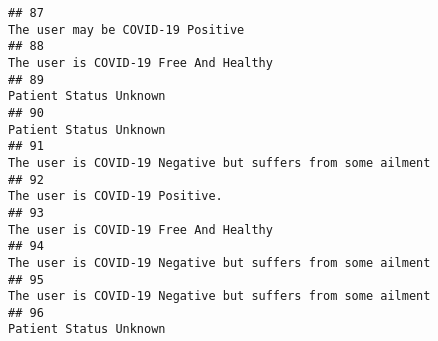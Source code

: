 \documentclass[
]{article}
\begin{document}
\begin{verbatim}
## 87                                                                                                                                                                                                                                   The user may be COVID-19 Positive
## 88                                                                                                                                                                                                                               The user is COVID-19 Free And Healthy
## 89                                                                                                                                                                                                                                              Patient Status Unknown
## 90                                                                                                                                                                                                                                              Patient Status Unknown
## 91                                                                                                                                                                                                         The user is COVID-19 Negative but suffers from some ailment
## 92                                                                                                                                                                                                                                      The user is COVID-19 Positive.
## 93                                                                                                                                                                                                                               The user is COVID-19 Free And Healthy
## 94                                                                                                                                                                                                         The user is COVID-19 Negative but suffers from some ailment
## 95                                                                                                                                                                                                         The user is COVID-19 Negative but suffers from some ailment
## 96                                                                                                                                                                                                                                              Patient Status Unknown

\end{verbatim}
\end{document}
